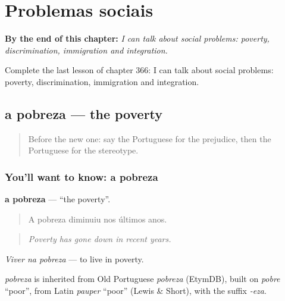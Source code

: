 
\chapter{Problemas sociais}
\label{ch:pt-problemas-sociais}

\begin{chapteropening}
\textbf{By the end of this chapter:} \emph{I can talk about social problems: poverty, discrimination, immigration and integration.}

Complete the last lesson of chapter 366: I can talk about social problems: poverty, discrimination, immigration and integration.
\end{chapteropening}

\section[a pobreza]{a pobreza — the poverty}

\label{lesson:PT-C366-pobreza}



\begin{quote}
Before the new one: say the Portuguese for the prejudice, then the Portuguese for the stereotype.
\end{quote}

\subsection*{You'll want to know: a pobreza}
\textbf{a pobreza} — \textquotedblleft{}the poverty\textquotedblright{}.

\begin{quote}
A pobreza diminuiu nos últimos anos.
\end{quote}

\begin{quote}
\emph{Poverty has gone down in recent years.}
\end{quote}

\emph{Viver na pobreza} — to live in poverty.

\begin{cousinweb}
\emph{pobreza} is inherited from Old Portuguese \emph{pobreza} (EtymDB), built on \emph{pobre} \textquotedblleft{}poor\textquotedblright{}, from Latin \emph{pauper} \textquotedblleft{}poor\textquotedblright{} (Lewis \& Short), with the suffix \emph{-eza}.
\end{cousinweb}

